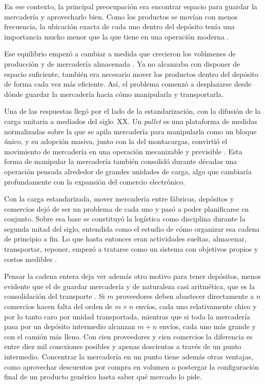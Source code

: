 En ese contexto, la principal preocupación era encontrar espacio para guardar la mercadería y aprovecharlo bien. Como los productos se movían con menos frecuencia, la ubicación exacta de cada uno dentro del depósito tenía una importancia mucho menor que la que tiene en una operación moderna \citep{ballou2007evolution}.


Ese equilibrio empezó a cambiar a medida que crecieron los volúmenes de producción y de mercadería almacenada \citep{ballou2007evolution}. Ya no alcanzaba con disponer de espacio suficiente, también era necesario mover los productos dentro del depósito de forma cada vez más eficiente. Así, el problema comenzó a desplazarse
desde dónde guardar la mercadería hacia cómo manipularla y transportarla.

Una de las respuestas llegó por el lado de la estandarización, con la difusión de la carga unitaria a mediados del siglo~XX.
Un \emph{pallet} es una plataforma de medidas normalizadas sobre la que se apila mercadería para manipularla como un bloque único, y su adopción masiva, junto con la del montacargas, convirtió el movimiento de mercadería en una operación mecanizable y previsible \citep[sección~5.1]{bartholdi2014warehouse}.
Esta forma de manipular la mercadería también consolidó durante décadas una operación pensada alrededor de grandes unidades de carga, algo que cambiaría profundamente con la expansión del comercio electrónico.

Con la carga estandarizada, mover mercadería entre fábricas, depósitos y comercios dejó de ser un problema de cada uno y pasó a poder planificarse en conjunto.
Sobre esa base se constituyó la logística como disciplina durante la segunda mitad del siglo, entendida como el estudio de cómo organizar esa cadena de principio a fin.
Lo que hasta entonces eran actividades sueltas, almacenar, transportar, reponer, empezó a tratarse como un sistema con objetivos propios y costos medibles \citep{ballou2007evolution}.

Pensar la cadena entera deja ver además otro motivo para tener depósitos, menos evidente que el de guardar mercadería y de naturaleza casi aritmética, que es la consolidación del transporte \citep[sección~1.1]{bartholdi2014warehouse}.
Si $m$ proveedores deben abastecer directamente a $n$ comercios hacen falta del orden de $m \times n$ envíos, cada uno relativamente chico y por lo tanto caro por unidad transportada, mientras que si toda la mercadería pasa por un depósito intermedio alcanzan $m + n$ envíos, cada uno más grande y con el camión más lleno.
Con cien proveedores y cien comercios la diferencia es entre diez mil conexiones posibles y apenas doscientas a través de un punto intermedio.
Concentrar la mercadería en un punto tiene además otras ventajas, como aprovechar descuentos por compra en volumen o postergar la configuración final de un producto genérico hasta saber qué mercado lo pide.

